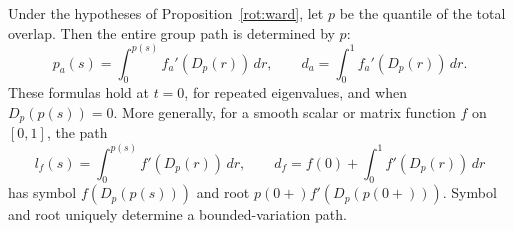 \begin{proposition}\label{rot:paths}
Under the hypotheses of Proposition~\ref{rot:ward}, let \(p\)
be the quantile of the total overlap.  Then the entire group path
is determined by \(p\):
\begin{equation}\label{rot:full-paths}
 p_a(s)=\int_0^{p(s)}f_a'(D_p(r))\,dr,\qquad
 d_a=\int_0^1f_a'(D_p(r))\,dr .
\end{equation}
These formulas hold at \(t=0\), for repeated eigenvalues, and when
\(D_p(p(s))=0\).  More generally, for a smooth scalar or matrix
function \(f\) on \([0,1]\), the path
\begin{equation}\label{rot:function-path}
 l_f(s)=\int_0^{p(s)}f'(D_p(r))\,dr,\qquad
 d_f=f(0)+\int_0^1f'(D_p(r))\,dr
\end{equation}
has symbol \(f(D_p(p(s)))\) and root
\(p(0+)f'(D_p(p(0+)))\).  Symbol and root uniquely determine
a bounded-variation path.
\end{proposition}

